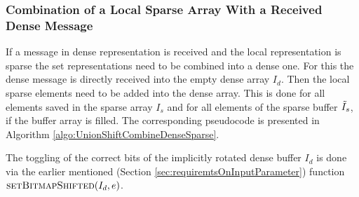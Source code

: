 \subsubsection{Combination of a Local Sparse Array With a Received Dense Message}
If a message in dense representation is received and the local representation is sparse the set representations need to be combined into a dense one.  For this the dense message is directly received into the empty dense array $I_d$. Then the local sparse elements need to be added into the dense array. This is done for all elements saved in the sparse array $I_s$ and for all elements of the sparse buffer $\Tilde{I}_s$, if the buffer array is filled. The corresponding pseudocode is presented in Algorithm \ref{algo:UnionShiftCombineDenseSparse}.
\begin{algorithm}[htb]
	\caption{Combine local sparse array with a received dense array.} \label{algo:UnionShiftCombineDenseSparse}
	\begin{algorithmic}[1]
		\State  {}
			\State {}
		\EndFor
			\State {}
			\EndFor
		\EndIf
		\EndProcedure
	\end{algorithmic}
\end{algorithm}
The toggling of the correct bits of the implicitly rotated dense buffer $I_d$ is done via the earlier mentioned (Section \ref{sec:requiremtsOnInputParameter}) function $\Call{setBitmapShifted}{I_d, e}$.


